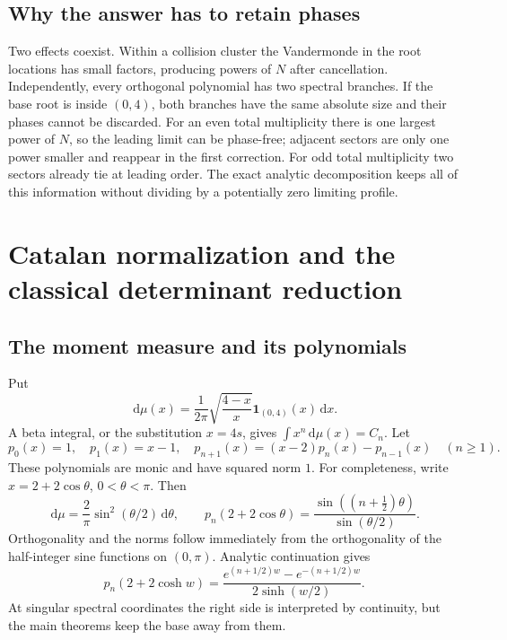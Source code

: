 \documentclass[11pt,a4paper]{article}
\numberwithin{equation}{section}
\theoremstyle{definition}
\theoremstyle{remark}
\newcommand{\dd}{\mathrm d}
\begin{document}
\subsection{Why the answer has to retain phases}
Two effects coexist. Within a collision cluster the Vandermonde
in the root locations has small factors, producing powers of $N$ after
cancellation. Independently, every orthogonal polynomial has two spectral
branches. If the base root is inside $(0,4)$, both branches have the same
absolute size and their phases cannot be discarded. For an even total
multiplicity there is one largest power of $N$, so the leading limit can
be phase-free; adjacent sectors are only one power smaller and reappear
in the first correction. For odd total multiplicity two sectors already
tie at leading order. The exact analytic decomposition keeps all of this
information without dividing by a potentially zero limiting profile.

\section{Catalan normalization and the classical determinant reduction}\label{ic:sec:normalization}
\subsection{The moment measure and its polynomials}
Put
\begin{equation}\label{ic:eq:measure}
 \,\dd\mu(x)=\frac{1}{2\pi}\sqrt{\frac{4-x}{x}}
 \mathbf1_{(0,4)}(x)\,\dd x.
\end{equation}
A beta integral, or the substitution $x=4s$, gives
$\int x^n\,\dd\mu(x)=C_n$. Let
\begin{equation}\label{ic:eq:prec}
 p_0(x)=1,\quad p_1(x)=x-1,\quad
 p_{n+1}(x)=(x-2)p_n(x)-p_{n-1}(x)\quad(n\ge1).
\end{equation}
These polynomials are monic and have squared norm $1$. For completeness,
write $x=2+2\cos\theta$, $0<\theta<\pi$. Then
\begin{equation}\label{ic:eq:ptrig}
 \,\dd\mu=\frac2\pi\sin^2(\theta/2)\,\dd\theta,
 \qquad
 p_n(2+2\cos\theta)=
 \frac{\sin((n+\tfrac12)\theta)}{\sin(\theta/2)}.
\end{equation}
Orthogonality and the norms follow immediately from the orthogonality of
the half-integer sine functions on $(0,\pi)$. Analytic continuation gives
\begin{equation}\label{ic:eq:phyper}
 p_n(2+2\cosh w)=
 \frac{e^{(n+1/2)w}-e^{-(n+1/2)w}}{2\sinh(w/2)}.
\end{equation}
At singular spectral coordinates the right side is interpreted by
continuity, but the main theorems keep the base away from them.
\end{document}
